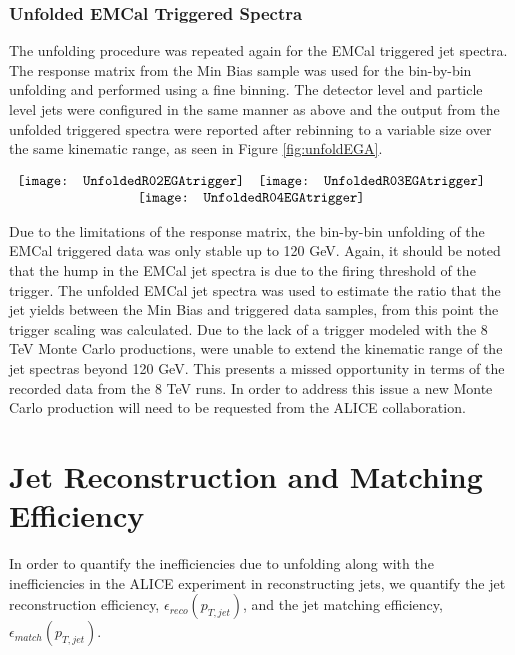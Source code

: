 \subsubsection{Unfolded EMCal Triggered Spectra}
The unfolding procedure was repeated again for the EMCal triggered jet spectra.  The response matrix from the Min Bias sample was used for the bin-by-bin unfolding and performed using a fine binning.  The detector level and particle level jets were configured in the same manner as above and the output from the unfolded triggered spectra were reported after rebinning to a variable size over the same kinematic range, as seen in Figure \ref{fig:unfoldEGA}.

\begin{figure*}[t!]
$\begin{array}{rl}
    \texttt{[image: UnfoldedR02EGAtrigger]} &
    \texttt{[image: UnfoldedR03EGAtrigger]}\\
    \multicolumn{2}{c}{\texttt{[image: UnfoldedR04EGAtrigger]}}
\end{array}$
\caption[Corrected EMCal Triggered Jet Spectra to Monte Carlo level for R = 0.2, R=0.3, and R = 0.4 jets.]{\label{fig:unfoldEGA}Unfolded EMCal Triggered Jet Spectra with correction factors, $C_{MC}$, for R = 0.2, R=0.3, and R = 0.4 jets.}
\end{figure*}


Due to the limitations of the response matrix, the bin-by-bin unfolding of the EMCal triggered data was only stable up to 120 GeV.  Again, it should be noted that the hump in the EMCal jet spectra is due to the firing threshold of the trigger.  The unfolded EMCal jet spectra was used to estimate the ratio that the jet yields between the Min Bias and triggered data samples, from this point the trigger scaling was calculated.  Due to the lack of a trigger modeled with the 8 TeV Monte Carlo productions, were unable to extend the kinematic range of the jet spectras beyond 120 GeV.  This presents a missed opportunity in terms of the recorded data from the 8 TeV runs.  In order to address this issue a new Monte Carlo production will need to be requested from the ALICE collaboration.

\section{Jet Reconstruction and Matching Efficiency}
In order to quantify the inefficiencies due to unfolding along with the inefficiencies in the ALICE experiment in reconstructing jets, we quantify the jet reconstruction efficiency, $\epsilon_{reco} (p_{T, jet})$, and the jet matching efficiency, $\epsilon_{match} (p_{T, jet})$.

